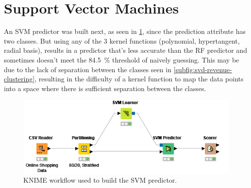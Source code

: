 \documentclass[../cmpe-251-project-report.tex]{subfiles}
\begin{document}
  \section{Support Vector Machines}
  An SVM predictor was built next, as seen in \cref{fig:svm-workflow}, since the prediction attribute has two classes. But using any of the 3 kernel functions (polynomial, hypertangent, radial basis), results in a predictor that's less accurate than the RF predictor and sometimes doesn't meet the \qty{84.5}{\percent} threshold of naively guessing. This may be due to the lack of separation between the classes seen in \cref{subfig:svd-revenue-clustering}, resulting in the difficulty of a kernel function to map the data points into a space where there is sufficient separation between the classes.
  \begin{figure}
    \includegraphics{img/svm-workflow.png}
    \caption{KNIME workflow used to build the SVM predictor.}
    \label{fig:svm-workflow}
  \end{figure}
\end{document}
